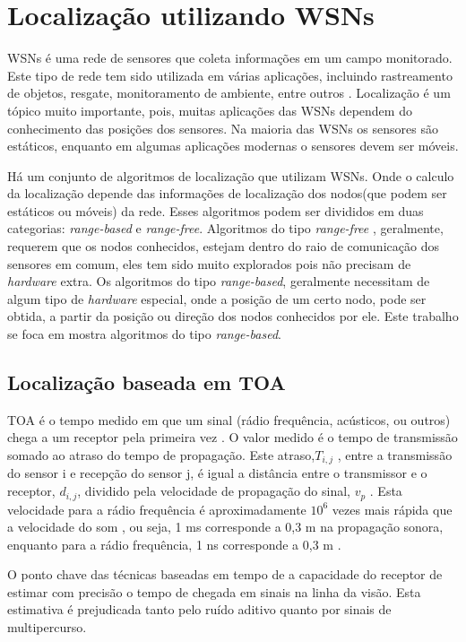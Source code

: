 \documentclass[12pt]{article}
\begin{document}
 \clearpage
\section{Localização utilizando WSNs}
	WSNs é uma rede de sensores que coleta informações em um campo monitorado. Este tipo de rede tem sido utilizada em 
	várias aplicações, incluindo rastreamento de objetos, resgate, monitoramento de ambiente, entre outros \cite{omc}. Localização é um 
	tópico muito importante, pois, muitas aplicações das WSNs dependem do conhecimento das posições dos sensores. Na maioria das WSNs 
	os sensores são estáticos, enquanto em algumas aplicações modernas o sensores devem ser móveis.
	
	Há um conjunto de algoritmos de localização que utilizam WSNs. Onde o calculo da localização depende das informações 
	de localização dos nodos(que podem ser estáticos ou móveis) da rede. Esses algoritmos podem ser divididos em duas categorias: \textit{range-based}
	e \textit{range-free}. Algoritmos do tipo \textit{range-free} \cite{omc} \cite{wsnsLinear}, geralmente, requerem que os nodos conhecidos, estejam dentro 
	do raio de comunicação dos sensores em comum, eles tem sido muito explorados pois não precisam de \textit{hardware} extra. Os algoritmos do tipo \textit{range-based},
	geralmente necessitam de algum tipo de \textit{hardware} especial, onde a posição de um certo nodo, pode ser obtida, a partir da posição ou direção dos nodos conhecidos por ele. Este trabalho 
	se foca em mostra algoritmos do tipo \textit{range-based}.
	
\subsection{Localização baseada em TOA}
	TOA é o tempo medido em que um sinal (rádio frequência, acústicos, ou outros) chega a um
receptor pela primeira vez \cite{gps}. O valor medido é o tempo de transmissão somado ao
atraso do tempo de propagação. Este atraso,$T_{i,j}$
, entre a transmissão do sensor i e recepção do sensor j, é igual a distância entre o transmissor e o receptor, 
$d_{i,j}$, dividido pela velocidade de propagação do sinal, $v_{p}$
. Esta velocidade para a rádio frequência é aproximadamente $10^{6}$  vezes mais rápida que a velocidade do som \cite{gps},
ou seja, 1 ms corresponde a 0,3 m na propagação sonora, enquanto para a rádio frequência, 1 ns corresponde a 0,3 m \cite{gps}.

O ponto chave das técnicas baseadas em tempo de a capacidade do receptor de
estimar com precisão o tempo de chegada em sinais na linha da visão. Esta estimativa é prejudicada tanto pelo ruído 
aditivo quanto por sinais de multipercurso.
\end{document}
